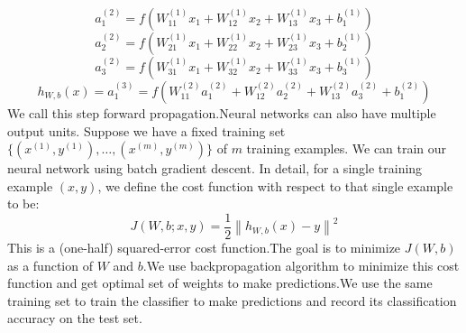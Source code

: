 \documentclass[11pt,twocolumn,letterpaper]{article}
\begin{document}
$$a_1^{(2)} = f(W_{11}^{(1)}x_1 + W_{12}^{(1)} x_2 + W_{13}^{(1)} x_3 + b_1^{(1)})$$
$$a_2^{(2)} = f(W_{21}^{(1)}x_1 + W_{22}^{(1)} x_2 + W_{23}^{(1)} x_3 + b_2^{(1)})$$
$$ a_3^{(2)} = f(W_{31}^{(1)}x_1 + W_{32}^{(1)} x_2 + W_{33}^{(1)} x_3 + b_3^{(1)})$$
$$h_{W,b}(x) = a_1^{(3)} =  f(W_{11}^{(2)}a_1^{(2)} + W_{12}^{(2)} a_2^{(2)} + W_{13}^{(2)} a_3^{(2)} + b_1^{(2)})$$
We call this step forward propagation.Neural networks can also have multiple output units.
Suppose we have a fixed training set $\{ (x^{(1)}, y^{(1)}), \ldots, (x^{(m)}, y^{(m)}) \}$ of $m$ training examples. We can train our neural network using batch gradient descent. In detail, for a single training example $(x,y)$, we define the cost function with respect to that single example to be:
$$ J(W,b; x,y) = \frac{1}{2} \left\| h_{W,b}(x) - y \right\|^2$$
This is a (one-half) squared-error cost function.The goal is to minimize $J(W,b)$ as a function of $W$ and $b$.We use backpropagation algorithm to minimize this cost function and get optimal set of weights to make predictions.We use the same training set to train the classifier to make predictions and record its classification accuracy on the test set.
\end{document}
